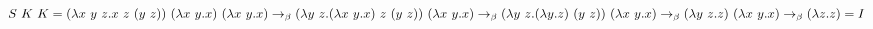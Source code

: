 \documentclass{article}
\begin{document}
\large
\noindent
$
S\ K\ K =
(\lambda x\ y\ z.x\ z\ (y\ z))\ (\lambda x\ y.x)\ (\lambda x\ y.x) \rightarrow_\beta \\
(\lambda y\ z.(\lambda x\ y.x)\ z\ (y\ z))\ (\lambda x\ y.x) \rightarrow_\beta \\
(\lambda y\ z.(\lambda y.z)\ (y\ z))\ (\lambda x\ y.x) \rightarrow_\beta
(\lambda y\ z.z)\ (\lambda x\ y.x) \rightarrow_\beta \\
(\lambda z. z) = I
$
\end{document}
